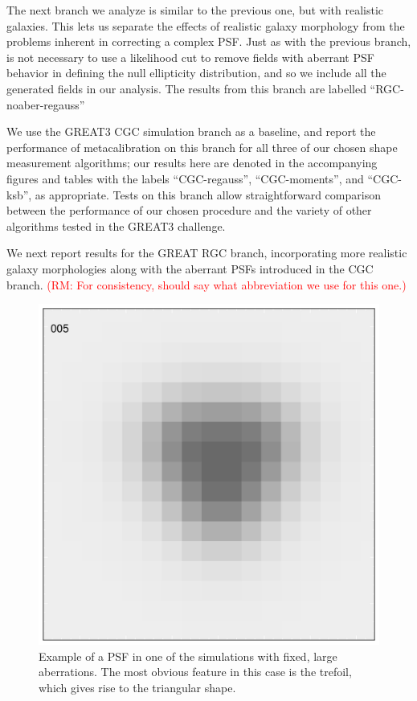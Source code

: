 \documentclass[iop]{emulateapj}
\newcommand\rmcomment[1]{\textcolor{red}{(RM: #1)}}
\begin{document}
The next branch we analyze is similar to the previous one, but with
realistic galaxies. This lets us separate the effects of realistic
galaxy morphology from the problems inherent in correcting a complex
PSF. Just as with the previous branch, is not necessary to use a
likelihood cut to remove fields with aberrant PSF behavior in defining
the null ellipticity distribution, and so we include all the generated
fields in our analysis. The results from this branch are labelled
``RGC-noaber-regauss''

We use the GREAT3 CGC simulation branch as a baseline, and report the
performance of metacalibration on this branch for all three of our
chosen shape measurement algorithms; our results here are denoted in
the accompanying figures and tables with the labels ``CGC-regauss'',
``CGC-moments'', and ``CGC-ksb'', as appropriate.  Tests on this branch allow
straightforward comparison between the performance of our chosen
procedure and the variety of other algorithms tested in the GREAT3
challenge.

We next report results for the GREAT RGC branch, incorporating more
realistic galaxy morphologies along with the aberrant PSFs introduced
in the CGC branch. \rmcomment{For consistency, should say what abbreviation we use for this one.}



\begin{figure}
\begin{center}
\includegraphics[width=0.8\columnwidth]{../Plots/rgc_fixedaber_psf_005.pdf}
\end{center}
\caption{Example of a PSF in one of the simulations with fixed, large aberrations.  The most obvious
feature in this case is the trefoil, which gives rise to the triangular shape. \label{fig:trefoil}}
\end{figure}
\end{document}
